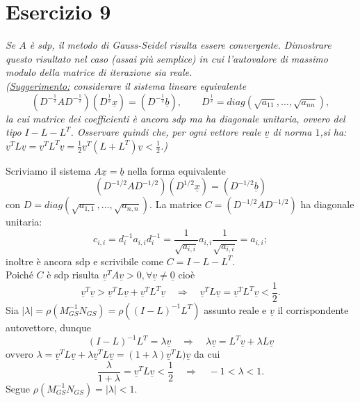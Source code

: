 \section{Esercizio 9}
\label{sub:es9}
\emph{Se $A$ è \textit{sdp}, il metodo di Gauss-Seidel risulta essere convergente.
      Dimostrare questo risultato nel caso (assai più semplice) in cui l'autovalore di massimo modulo della matrice di iterazione sia reale.\\
			(\underline{Suggerimento:} considerare il sistema lineare equivalente
			$$(D^{-\frac{1}{2}}AD^{-\frac{1}{2}})(D^{\frac{1}{2}}\underline{x})=(D^{-\frac{1}{2}}\underline{b}),\qquad D^{\frac{1}{2}}=diag(\sqrt{a_{11}},\dots,\sqrt{a_{nn}}),$$
			la cui matrice dei coefficienti è ancora \textit{sdp} ma ha diagonale unitaria,
      ovvero del tipo $I-L-L^T$. Osservare quindi che, per ogni vettore reale $\underline{v}$ di norma $1$,si ha:
      $\underline{v}^TL\underline{v}=\underline{v}^TL^T\underline{v}=\frac{1}{2}\underline{v}^T(L+L^T)\underline{v}<\frac{1}{2}$.)}
\begin{sol}
  Scriviamo il sistema $A\underline{x}=\underline{b}$ nella forma equivalente
  $$\left(D^{-1/2}AD^{-1/2}\right)\left(D^{1/2}\underline{x}\right)=\left(D^{-1/2}\underline{b}\right)$$
  con $D=diag(\sqrt{a_{1,1}},\ldots,\sqrt{a_{n,n}})$.
  La matrice $C=\left(D^{-1/2}AD^{-1/2}\right)$ ha diagonale unitaria:
  $$c_{i,i}=d_i^{-1}a_{i,i}d_i^{-1}=\frac{1}{\sqrt{a_{i,i}}}a_{i,i}\frac{1}{\sqrt{a_{i,i}}}=a_{i,i};$$
  inoltre è ancora sdp e scrivibile come $C=I-L-L^T$.\\
  Poiché $C$ è sdp risulta $\underline{v}^TA\underline{v}>0, \forall\underline{v}\neq\underline{0}$
  cioè $$\underline{v}^T\underline{v}>\underline{v}^TL\underline{v}+\underline{v}^TL^T\underline{v}\quad\Rightarrow\quad\underline{v}^TL\underline{v}=\underline{v}^TL^T\underline{v}<\frac{1}{2}.$$
  Sia $|\lambda|=\rho(M_{GS}^{-1}N_{GS})=\rho\left((I-L)^{-1}L^T\right)$
  assunto reale e $\underline{v}$ il corrispondente autovettore, dunque
  $$(I-L)^{-1}L^T=\lambda\underline{v}\quad\Rightarrow\quad\lambda\underline{v}=L^T\underline{v}+\lambda L\underline{v}$$
  ovvero $\lambda=\underline{v}^TL\underline{v}+\lambda\underline{v}^TL\underline{v}=(1+\lambda)\underline{v}^TL)\underline{v}$
  da cui $$\frac{\lambda}{1+\lambda}=\underline{v}^TL\underline{v}<\frac{1}{2}\quad\Rightarrow\quad -1<\lambda<1.$$
  Segue $\rho(M_{GS}^{-1}N_{GS})=|\lambda|<1$.
\end{sol}


